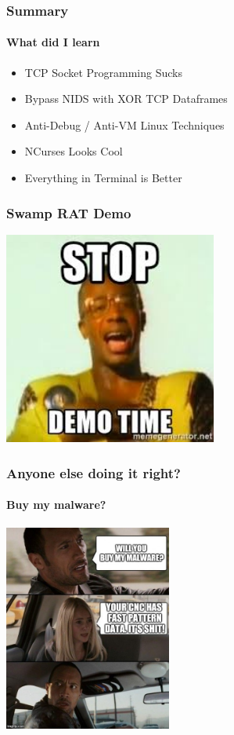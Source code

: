 \documentclass[aspectratio=169]{beamer}
\begin{document}
\begin{frame}
  \frametitle{Summary}
  \framesubtitle{What did I learn}
  \begin{itemize}
  \item{TCP Socket Programming Sucks}
  \item{Bypass NIDS with XOR TCP Dataframes}
  \item{Anti-Debug / Anti-VM Linux Techniques}
  \item{NCurses Looks Cool}
  \item{Everything in Terminal is Better}
  \end{itemize}
\end{frame}

\begin{frame}
  \frametitle{Swamp RAT Demo}
  \begin{center}
    \includegraphics[width=7cm,keepaspectratio]{demo_meme}
  \end{center}
\end{frame}

\begin{frame}
  \frametitle{Anyone else doing it right?}
  \framesubtitle{Buy my malware?}
  \begin{center}
    \includegraphics[width=5.5cm,keepaspectratio]{malware_the_rock_meme}
  \end{center}
\end{frame}
\end{document}
